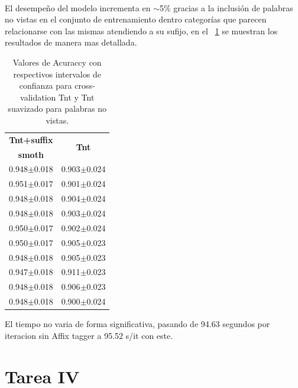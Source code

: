 \documentclass[11pt,a4paper]{report}
\begin{document}
	\\ 
	El desempeño del modelo incrementa en $\sim$5\% gracias a la inclusión de palabras no vistas en el conjunto de entrenamiento dentro categorías que parecen relacionarse con las mismas atendiendo a su sufijo, en el \tablename~\ref{tnt-comparison} se muestran los resultados de manera mas detallada.\\
	
			\begin{table}[thb!]
		\begin{center} 		
			\begin{tabular}{cc} 
				\hline	
				\textbf{Tnt+suffix}&\multirow{2}{*}{\textbf{Tnt}}\\
				\textbf{smoth}&\\
				\hline
				0.948$\pm$0.018&0.903$\pm$0.024\\
				0.951$\pm$0.017&0.901$\pm$0.024\\
				0.948$\pm$0.018&0.904$\pm$0.024\\
				0.948$\pm$0.018&0.903$\pm$0.024\\
				0.950$\pm$0.017&0.902$\pm$0.024\\
				0.950$\pm$0.017&0.905$\pm$0.023\\
				0.948$\pm$0.018&0.905$\pm$0.023\\
				0.947$\pm$0.018&0.911$\pm$0.023\\
				0.948$\pm$0.018&0.906$\pm$0.023\\
				0.948$\pm$0.018&0.900$\pm$0.024\\
				\hline
			\end{tabular}
			\caption{Valores de Acuraccy con respectivos intervalos de confianza para cross-validation Tnt y Tnt suavizado para palabras no vistas.}	
			\label{tnt-comparison}
		\end{center}
	\end{table}		 	
	El tiempo no varia de forma significativa, pasando de 94.63 segundos por iteracion sin Affix tagger a 95.52 s/it con este. 
	

	\section*{Tarea IV}
\end{document}
